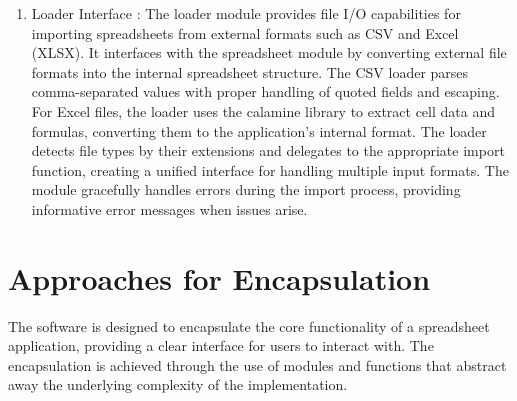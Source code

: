 \documentclass[10pt,a4paper]{article}  %
\begin{document}
\begin{enumerate}
    \item Loader Interface : The loader module provides file I/O capabilities for importing spreadsheets from external formats such as CSV and Excel (XLSX). It interfaces with the spreadsheet module by converting external file formats into the internal spreadsheet structure. The CSV loader parses comma-separated values with proper handling of quoted fields and escaping. For Excel files, the loader uses the calamine library to extract cell data and formulas, converting them to the application's internal format. The loader detects file types by their extensions and delegates to the appropriate import function, creating a unified interface for handling multiple input formats. The module gracefully handles errors during the import process, providing informative error messages when issues arise.
\end{enumerate}
\section{Approaches for Encapsulation}
The software is designed to encapsulate the core functionality of a spreadsheet application, providing a clear interface for users to interact with. The encapsulation is achieved through the use of modules and functions that abstract away the underlying complexity of the implementation.
\end{document}
